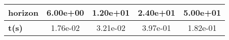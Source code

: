 \begin{tiny}\begin{tabular}{|l|c|c|c|c|}
\hline
\textbf{horizon}&6.00e+00&1.20e+01&2.40e+01&5.00e+01\\\hline
\textbf{t(s)}&1.76e-02&3.21e-02&3.97e-01&1.82e-01\\\hline
\end{tabular}
\end{tiny}